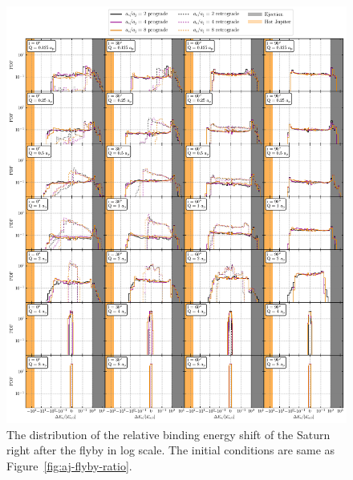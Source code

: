 \documentclass[twocolumn]{aastex63}
\newcommand*\fgr[1]{Figure~\ref{#1}}
\begin{document}
\begin{figure}
    \includegraphics[width=\textwidth]{figs/dEs-flyby-ratio.pdf}
    \caption{The distribution of the relative binding energy shift of the Saturn right after the flyby in log scale. The initial conditions are same as \fgr{fig:aj-flyby-ratio}.} 
    \label{fig:dEs-flyby-ratio}
\end{figure}
\end{document}
